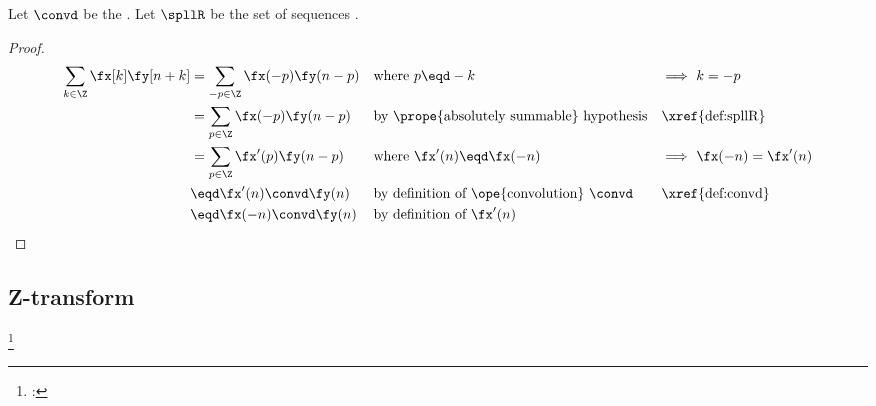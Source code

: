\begin{proposition}
\label{prop:conv_knk}
Let $\convd$ be the  .
Let $\spllR$ be the set of  sequences .
\end{proposition}
\begin{proof}
\begin{align*}
  \sum_{k\in\Z} \fx[k]\fy[n+k] 
    &= \sum_{-p\in\Z} \fx(-p)\fy(n-p) 
    && \text{where $p\eqd -k$}
    && \text{$\implies$ $k=-p$}
  \\&= \sum_{p\in\Z} \fx(-p)\fy(n-p) 
    && \text{by \prope{absolutely summable} hypothesis}
    && \text{\xref{def:spllR}}
  \\&= \sum_{p\in\Z} \fx'(p)\fy(n-p) 
    && \text{where $\fx'(n) \eqd\fx(-n)$}
    && \text{$\implies$ $\fx(-n)=\fx'(n)$}
  \\&\eqd \fx'(n)\convd\fy(n)
    && \text{by definition of \ope{convolution} $\convd$}
    && \text{\xref{def:convd}}
  \\&\eqd \fx(-n)\convd\fy(n)
    && \text{by definition of $\fx'(n)$}
\end{align*}
\end{proof}

\subsection{Z-transform}
\begin{definition}
\footnote{
  : 
  }
\label{def:opZ}
\end{definition}


